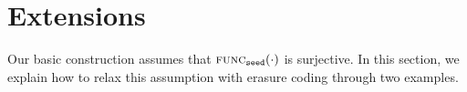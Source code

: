 \documentclass[conference]{IEEEtran}
\newcommand{\id}{\texttt{id}}
\newcommand{\seed}{\texttt{seed}}
\newcommand{\ind}{\texttt{index}}
\newcommand{\mask}{\textsc{mask}}
\newcommand{\func}{\textsc{func}}
\begin{document}




\section{Extensions}

Our basic construction assumes that $\func_{\seed}(\cdot)$ is surjective. In this section, we explain how to relax this assumption with erasure coding through two examples.

\end{document}
